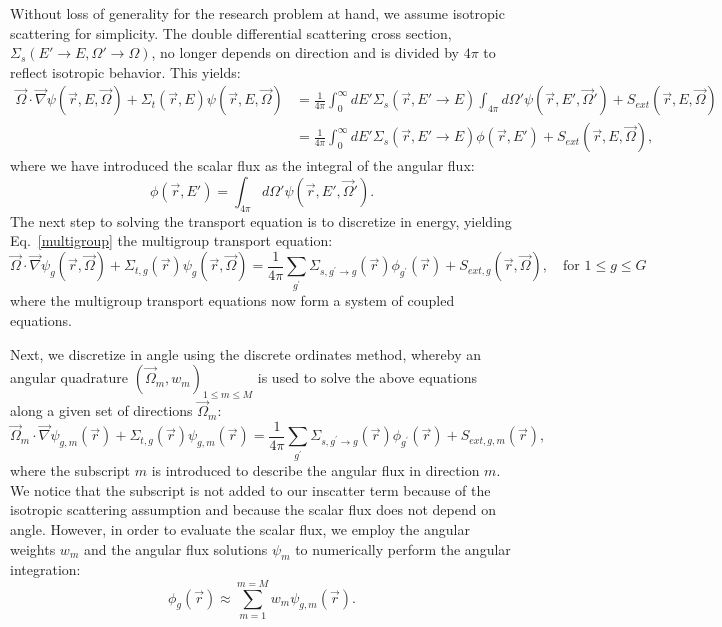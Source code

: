 \documentclass[11pt, letterpaper,titlepage,oneside]{article}
\newcommand{\vr}{\vec{r}}
\newcommand{\vo}{\vec{\Omega}}
\begin{document}
Without loss of generality for the research problem at hand, we assume isotropic scattering for simplicity. The double differential scattering cross section, $\Sigma_s(E'\to E, \Omega'\to\Omega)$, no longer depends on direction and is divided by $4\pi$ to reflect isotropic behavior. This yields:
\begin{align}
\label{isotropic}
\vo \cdot \vec \nabla \psi(\vr,E,\vo) +\Sigma_t(\vr,E) \psi(\vr,E,\vo)  
& = \frac{1}{4\pi}\int_{0}^{\infty}dE' \Sigma_s(\vr,E'\to E) \int_{4\pi}d\Omega' \psi(\vr,E',\vo')  + S_{ext}(\vr,E,\vo) \nonumber \\
& = \frac{1}{4\pi}\int_{0}^{\infty}dE' \Sigma_s(\vr,E'\to E) \phi(\vr,E')  + S_{ext}(\vr,E,\vo) ,
\end{align}
where we have introduced the scalar flux as the integral of the angular flux:
\begin{equation}
\label{def_scalar_flux}
\phi(\vr,E') = \int_{4\pi}d\Omega' \psi(\vr,E',\vo').
\end{equation}
The next step to solving the transport equation is to discretize in energy, yielding Eq.~\eqref{multigroup} the multigroup transport equation:
\begin{equation}
\vo \cdot \vec \nabla \psi_g(\vr,\vo) +\Sigma_{t,g}(\vr) \psi_g(\vr,\vo) = \frac{1}{4\pi}\sum_{g^{\prime}}\Sigma_{s,g^{\prime}\to g}(\vr)\phi_{g^{\prime}}(\vr) + S_{ext,g}(\vr,\vo), \quad \text{for } 1 \le g \le G
\label{multigroup}
\end{equation}
where the multigroup transport equations now form a system of coupled equations. 

Next, we discretize in angle using the discrete ordinates method\cite{denovo}, whereby an angular quadrature $\left( \vo_m, w_m \right)_{1 \le m \le M}$ is used to solve the above equations along a given set of directions $\vo_m$:
\begin{equation}
\vo_m \cdot \vec \nabla \psi_{g,m}(\vr) +\Sigma_{t,g}(\vr) \psi_{g,m}(\vr)  = \frac{1}{4\pi}\sum_{g^{\prime}}\Sigma_{s,g^{\prime}\to g}(\vr)\phi_{g^{\prime}}(\vr) + S_{ext,g,m}(\vr),
\label{angle}
\end{equation}
where the subscript $m$ is introduced to describe the angular flux in direction $m$. We notice that the subscript is not added to our inscatter term because of the isotropic scattering assumption and because the scalar flux does not depend on angle. However, in order to evaluate the scalar flux, we employ the angular weights $w_m$ and the angular flux solutions
$\psi_m$ to numerically perform the angular integration:
\begin{equation}
\label{def_scalar_flux_2}
\phi_g(\vr) \approx \sum_{m=1}^{m=M} w_m \psi_{g,m}(\vr).
\end{equation}
\end{document}

